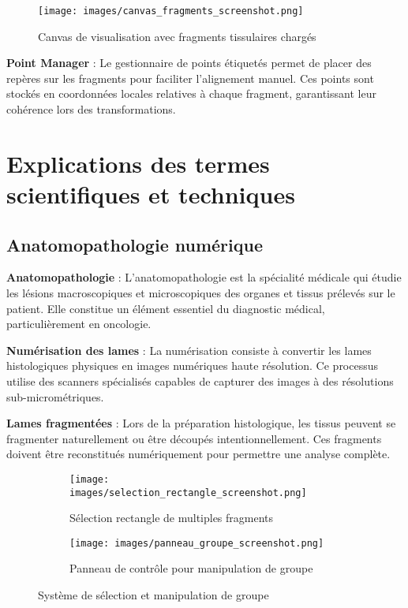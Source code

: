 \documentclass[12pt,a4paper]{report}
\begin{document}
\begin{}
\begin{}
\begin{}
\begin{figure}[H]
\centering
\texttt{[image: images/canvas\_fragments\_screenshot.png]}
\caption{Canvas de visualisation avec fragments tissulaires chargés}
\label{fig:canvas_fragments}
\end{figure}

\textbf{Point Manager} : Le gestionnaire de points étiquetés permet de placer des repères sur les fragments pour faciliter l'alignement manuel. Ces points sont stockés en coordonnées locales relatives à chaque fragment, garantissant leur cohérence lors des transformations.

\section{Explications des termes scientifiques et techniques}

\subsection{Anatomopathologie numérique}

\textbf{Anatomopathologie} : L'anatomopathologie est la spécialité médicale qui étudie les lésions macroscopiques et microscopiques des organes et tissus prélevés sur le patient. Elle constitue un élément essentiel du diagnostic médical, particulièrement en oncologie.

\textbf{Numérisation des lames} : La numérisation consiste à convertir les lames histologiques physiques en images numériques haute résolution. Ce processus utilise des scanners spécialisés capables de capturer des images à des résolutions sub-micrométriques.

\textbf{Lames fragmentées} : Lors de la préparation histologique, les tissus peuvent se fragmenter naturellement ou être découpés intentionnellement. Ces fragments doivent être reconstitués numériquement pour permettre une analyse complète.

\begin{figure}[H]
\centering
\begin{subfigure}{0.48\textwidth}
\texttt{[image: images/selection\_rectangle\_screenshot.png]}
\caption{Sélection rectangle de multiples fragments}
\end{subfigure}
\hfill
\begin{subfigure}{0.48\textwidth}
\texttt{[image: images/panneau\_groupe\_screenshot.png]}
\caption{Panneau de contrôle pour manipulation de groupe}
\end{subfigure}
\caption{Système de sélection et manipulation de groupe}
\label{fig:selection_groupe}
\end{figure}


\end{}
\end{}
\end{}
\end{document}
